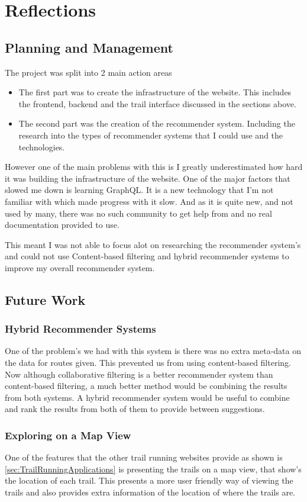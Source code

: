\chapter{Reflections}
\section{Planning and Management}
The project was split into 2 main action areas
\begin{itemize}
    \item The first part was to create the infrastructure of the website. This includes the frontend, backend and the trail interface discussed in the sections above.
    \item The second part was the creation of the recommender system. Including the research into the types of recommender systems that I could use and the technologies.
\end{itemize}

However one of the main problems with this is I greatly underestimated how hard it was building the infrastructure of the website. One of the major factors that slowed me down is learning GraphQL. It is a new technology that I'm not familiar with which made progress with it slow. And as it is quite new, and not used by many, there was no such community to get help from and no real documentation provided to use. 

This meant I was not able to focus alot on researching the recommender system's and could not use Content-based filtering and hybrid recommender systems to improve my overall recommender system.
\section{Future Work}
\subsection{Hybrid Recommender Systems}
One of the problem's we had with this system is there was no extra meta-data on the data for routes given. This prevented us from using content-based filtering. Now although collaborative filtering is a better recommender system than content-based filtering, a much better method would be combining the results from both systems. A hybrid recommender system would be useful to combine and rank the results from both of them to provide between suggestions.

\subsection{Exploring on a Map View}
One of the features that the other trail running websites provide as shown is \autoref{sec:TrailRunningApplications} is presenting the trails on a map view, that show's the location of each trail. This presents a more user friendly way of viewing the trails and also provides extra information of the location of where the trails are.

